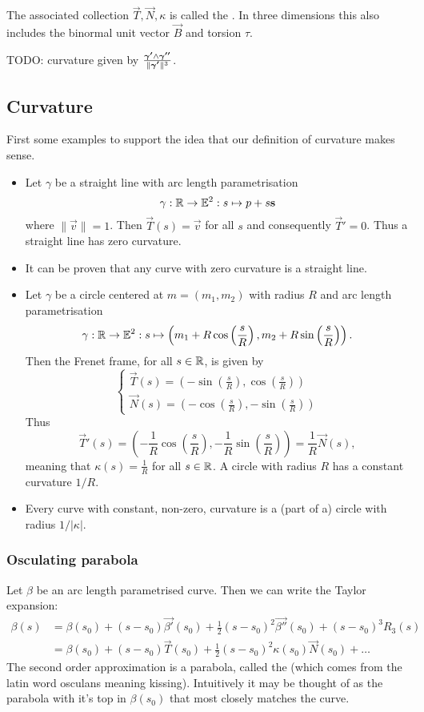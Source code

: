 The associated collection $\vec{T}, \vec{N}, \kappa$ is called the . In three dimensions this also includes the binormal unit vector $\vec{B}$ and torsion $\tau$.


TODO: curvature given by $\frac{\boldsymbol{\mathrm{\gamma'}}\wedge\boldsymbol{\mathrm{\gamma^{\prime\prime}}}}{\lVert\boldsymbol{\mathrm{\gamma'}}\rVert^3}$.

\subsection{Curvature}
First some examples to support the idea that our definition of curvature makes sense.
\begin{example}
\begin{itemize}
\item Let $\gamma$ be a straight line with arc length parametrisation
\[ \gamma: \mathbb{R} \to \mathbb{E}^2: s\mapsto p + s \boldsymbol{\mathrm{s}} \]
where $\lVert \vec{v}\lVert = 1$. Then $\vec{T}(s) = \vec{v}$ for all $s$ and consequently $\vec{T}' = 0$. Thus a straight line has zero curvature.
\item It can be proven that any curve with zero curvature is a straight line.
\item Let $\gamma$ be a circle centered at $m= (m_1,m_2)$ with radius $R$ and arc length parametrisation
\[ \gamma: \mathbb{R} \to \mathbb{E}^2: s\mapsto \left(m_1 + R\cos \left(\frac{s}{R}\right), m_2 + R\sin \left(\frac{s}{R}\right)\right). \]
Then the Frenet frame, for all $s\in\mathbb{R}$, is given by
\[ \begin{cases}
\vec{T}(s) = \left(-\sin \left(\frac{s}{R}\right), \cos \left(\frac{s}{R}\right)\right) \\
\vec{N}(s) = \left(-\cos \left(\frac{s}{R}\right), -\sin \left(\frac{s}{R}\right)\right)
\end{cases} \]
Thus
\[ \vec{T}'(s) = \left(- \frac{1}{R}\cos \left(\frac{s}{R}\right), - \frac{1}{R}\sin \left(\frac{s}{R}\right)\right) = \frac{1}{R} \vec{N}(s), \]
meaning that $\kappa(s) = \frac{1}{R}$ for all $s\in \mathbb{R}$. A circle with radius $R$ has a constant curvature $1/R$.
\item Every curve with constant, non-zero, curvature is a (part of a) circle with radius $1/|\kappa|$.
\end{itemize}
\end{example}
\subsubsection{Osculating parabola}
Let $\beta$ be an arc length parametrised curve. Then we can write the Taylor expansion:
\begin{align*}
\beta(s) &= \beta(s_0) + (s-s_0)\vec{\beta'}(s_0) + \frac{1}{2}(s-s_0)^2\vec{\beta''}(s_0) + (s-s_0)^3R_3(s) \\
&= \beta(s_0) + (s-s_0)\vec{T}(s_0) + \frac{1}{2}(s-s_0)^2\kappa(s_0)\vec{N}(s_0) + \ldots
\end{align*}
The second order approximation is a parabola, called the  (which comes from the latin word osculans meaning kissing). Intuitively it may be thought of as the parabola with it's top in $\beta(s_0)$ that most closely matches the curve.

